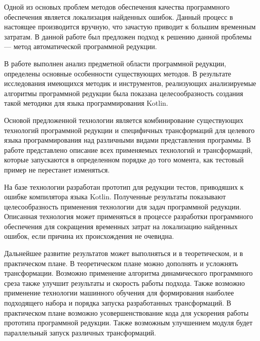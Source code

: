 \conclusion
Одной из основых проблем методов обеспечения качества программного обеспечения является локализация найденных ошибок. Данный процесс в настоящее производится вручную, что зачастую приводит к большим временным затратам. В данной работе был предложен подход к решению данной проблемы --- метод автоматической программной редукции.

В работе выполнен анализ предметной области программной редукции, определены основные особенности существующих методов. В результате исследования имеющихся методик и инструментов, реализующих анализируемые алгоритмы программной редукции была показана целесообразность создания такой методики для языка программирования Kotlin.

Основой предложенной технологии является комбинирование существующих технологий программной редукции и специфичных трансформаций для целевого языка программирования над различными видами представления программы. В работе представлено описание всех применяемых технологий и трансформаций, которые запускаются в определенном порядке до того момента, как тестовый пример не перестанет изменяться. 

На базе технологии разработан прототип для редукции тестов, приводяших к ошибке компилятора языка Kotlin. Полученные результаты показывают целесообразность применения технологии для задач программной редукции. Описанная технология может применяться в процессе разработки программного обеспечения для сокращения временных затрат на локализацию найденных ошибок, если причина их происхождения не очевидна. 

Дальнейшее развитие результатов может выполняться и в теоретическом, и в практическом плане. В теоретическом плане можно дополнять и усложнять трансформации. Возможно применение алгоритма динамического программного среза также улучшит результаты и скорость работы подхода. Также возможно применение технологии машинного обучения для формирования наиболее подходящего набора и порядка запуска разработанных трансформаций. В практическом плане возможно усовершенствование кода для ускорения работы прототипа программной редукции. Также возможным улучшением модуля будет параллельный запуск различных трансформаций.


